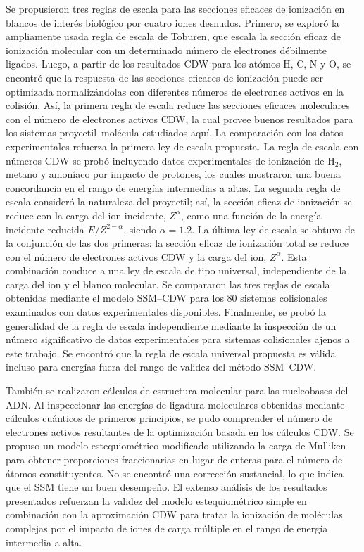 Se propusieron tres reglas de escala para las secciones eficaces de 
ionización en blancos de interés biológico por cuatro iones desnudos. 
Primero, se exploró la ampliamente usada regla de escala de Toburen, que 
escala la sección eficaz de ionización molecular con un determinado 
número de electrones débilmente ligados. Luego, a partir de los 
resultados CDW para los atómos H, C, N y O, se encontró que la respuesta 
de las secciones eficaces de ionización puede ser optimizada 
normalizándolas con diferentes números de electrones activos en la 
colisión. Así, la primera regla de escala reduce las secciones eficaces 
moleculares con el número de electrones activos CDW, la cual provee 
buenos resultados para los sistemas proyectil--molécula estudiados aquí. 
La comparación con los datos experimentales refuerza la primera ley de 
escala propuesta. La regla de escala con números CDW se probó incluyendo 
datos experimentales de ionización de H$_2$, metano y amoníaco por 
impacto de protones, los cuales mostraron una buena concordancia en el 
rango de energías intermedias a altas. La segunda regla de escala 
consideró la naturaleza del proyectil; así, la sección eficaz de 
ionización se reduce con la carga del ion incidente, $Z^{\alpha}$, como 
una función de la energía incidente reducida $E/Z^{2-\alpha}$, siendo 
$\alpha=1.2$. La última ley de escala se obtuvo de la conjunción de las 
dos primeras: la sección eficaz de ionización total se reduce con el 
número de electrones activos CDW y la carga del ion, $Z^{\alpha}$. Esta 
combinación conduce a una ley de escala de tipo universal, independiente 
de la carga del ion y el blanco molecular. Se compararon las tres reglas 
de escala obtenidas mediante el modelo SSM--CDW para los 80 sistemas 
colisionales examinados con datos experimentales disponibles. 
Finalmente, se probó la generalidad de la regla de escala independiente 
mediante la inspección de un número significativo de datos 
experimentales para sistemas colisionales ajenos a este trabajo. Se 
encontró que la regla de escala universal propuesta es válida incluso 
para energías fuera del rango de validez del método SSM--CDW.

También se realizaron cálculos de estructura molecular para las 
nucleobases del ADN. Al inspeccionar las energías de ligadura 
moleculares obtenidas mediante cálculos cuánticos de primeros principios, 
se pudo comprender el número de electrones activos resultantes de la 
optimización basada en los cálculos CDW. Se propuso un modelo 
estequiométrico modificado utilizando la carga de Mulliken para obtener 
proporciones fraccionarias en lugar de enteras para el número de átomos 
constituyentes. No se encontró una corrección sustancial, lo que indica 
que el SSM tiene un buen desempeño. El extenso análisis de los 
resultados presentados refuerzan la validez del modelo estequiométrico 
simple en combinación con la aproximación CDW para tratar la ionización 
de moléculas complejas por el impacto de iones de carga múltiple en el 
rango de energía intermedia a alta. 


